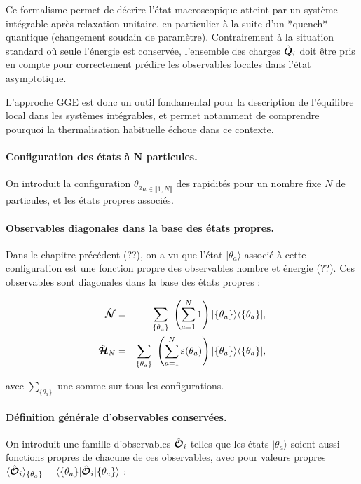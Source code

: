 Ce formalisme permet de décrire l’état macroscopique atteint par un système intégrable après relaxation unitaire, en particulier à la suite d’un *quench* quantique (changement soudain de paramètre). Contrairement à la situation standard où seule l’énergie est conservée, l’ensemble des charges \( \hat{\bm{Q}}_i \) doit être pris en compte pour correctement prédire les observables locales dans l’état asymptotique.

L’approche GGE est donc un outil fondamental pour la description de l’équilibre local dans les systèmes intégrables, et permet notamment de comprendre pourquoi la thermalisation habituelle échoue dans ce contexte.

\paragraph{Configuration des états à N particules.}
On introduit la configuration ${ \theta_a }_{a\in \llbracket 1 , N \rrbracket}$ des rapidités pour un nombre fixe $N$ de particules, et les états propres associés.

\paragraph{Observables diagonales dans la base des états propres.}
Dans le chapitre précédent (??), on a vu que l'état $\vert { \theta_a } \rangle$ associé à cette configuration est une fonction propre des observables nombre et énergie (??). Ces observables sont diagonales dans la base des états propres :

\begin{eqnarray}
	\operator{\mathcal{N}} & = & \sum_{ \{\theta_a\} }   \left ( \sum_{a = 1}^N  1 \right )  \vert \{ \theta_a\}\rangle	\langle \{ \theta_a \}\vert,\\
	\operator{\mathcal{H}}_N & = & \sum_{\{ \theta_a\}}  \left ( \sum_{a = 1}^N  \varepsilon ( \theta_a ) \right )   \vert \{ \theta_a\}\rangle	\langle \{ \theta_a \}\vert,		
\end{eqnarray}

avec $ \sum_{\{ \theta_a\}}$ une somme sur tous les configurations.\\


\paragraph{Définition générale d'observables conservées.}
On introduit une famille d'observables $\hat{\bm{\mathcal{O}}}_i$ telles que les états $\vert { \theta_a } \rangle$ soient aussi fonctions propres de chacune de ces observables, avec pour valeurs propres $\langle \hat{\bm{\mathcal{O}}}_i \rangle_{\{\theta_a \}} = \langle \{ \theta_a \} \vert\hat{\bm{\mathcal{O}}}_i \vert \{ \theta_a \} \rangle$ :\\

